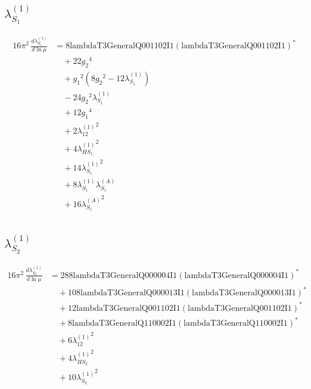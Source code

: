 \documentclass[10pt,a4paper]{article}
\begin{document}
\subsection*{$\lambda_{S_1}^{(1)}$}
\begin{align*}
16\pi^2\,\frac{d \lambda_{S_1}^{(1)}}{d\ln\mu} &=8 \text{lambdaT3GeneralQ001102I1} \left(\text{lambdaT3GeneralQ001102I1}\right)^{*} \\
&\quad +22 {g_2}^4 \\
&\quad +{g_1}^2 \left(8 {g_2}^2-12 {\lambda_{S_1}^{(1)}}\right) \\
&\quad -24 {g_2}^2 {\lambda_{S_1}^{(1)}} \\
&\quad +12 {g_1}^4 \\
&\quad +2 {\lambda_{12}^{(1)}}^2 \\
&\quad +4 {\lambda_{HS_1}^{(1)}}^2 \\
&\quad +14 {\lambda_{S_1}^{(1)}}^2 \\
&\quad +8 {\lambda_{S_1}^{(1)}} {\lambda_{S_1}^{(A)}} \\
&\quad +16 {\lambda_{S_1}^{(A)}}^2 \\
\end{align*}
\subsection*{$\lambda_{S_2}^{(1)}$}
\begin{align*}
16\pi^2\,\frac{d \lambda_{S_2}^{(1)}}{d\ln\mu} &=288 \text{lambdaT3GeneralQ000004I1} \left(\text{lambdaT3GeneralQ000004I1}\right)^{*} \\
&\quad +108 \text{lambdaT3GeneralQ000013I1} \left(\text{lambdaT3GeneralQ000013I1}\right)^{*} \\
&\quad +12 \text{lambdaT3GeneralQ001102I1} \left(\text{lambdaT3GeneralQ001102I1}\right)^{*} \\
&\quad +8 \text{lambdaT3GeneralQ110002I1} \left(\text{lambdaT3GeneralQ110002I1}\right)^{*} \\
&\quad +6 {\lambda_{12}^{(1)}}^2 \\
&\quad +4 {\lambda_{HS_2}^{(1)}}^2 \\
&\quad +10 {\lambda_{S_2}^{(1)}}^2 \\
\end{align*}
\end{document}

